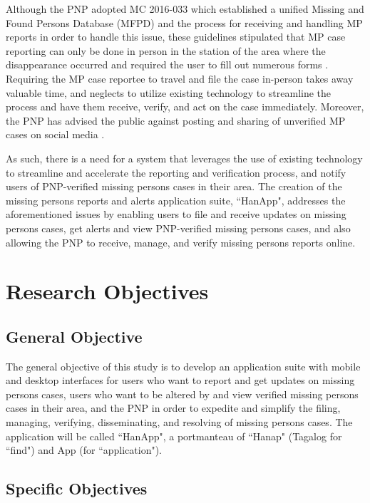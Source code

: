 Although the PNP adopted MC 2016-033 which established a unified Missing and Found Persons Database (MFPD) and the process for receiving and handling MP reports in order to handle this issue, these guidelines stipulated that MP case reporting can only be done in person in the station of the area where the disappearance occurred and required the user to fill out numerous forms \cite{NationalPoliceCommission}. Requiring the MP case reportee to travel and file the case in-person takes away valuable time, and neglects to utilize existing technology to streamline the process and have them receive, verify, and act on the case immediately. Moreover, the PNP has advised the public against posting and sharing of unverified MP cases on social media \cite{madarang_2022}.

As such, there is a need for a system that leverages the use of existing technology to streamline and accelerate the reporting and verification process, and notify users of PNP-verified missing persons cases in their area. The creation of the missing persons reports and alerts application suite, ``HanApp", addresses the aforementioned issues by enabling users to file and receive updates on missing persons cases, get alerts and view PNP-verified missing persons cases, and also allowing the PNP to receive, manage, and verify missing persons reports online.

\section{Research Objectives}
\label{sec:researchobjectives}

\subsection{General Objective}
\label{sec:generalobjective}

The general objective of this study is to develop an application suite with mobile and desktop interfaces for users who want to report and get updates on missing persons cases, users who want to be altered by and view verified missing persons cases in their area, and the PNP in order to expedite and simplify the filing, managing, verifying, disseminating, and resolving of missing persons cases. The application will be called ``HanApp", a portmanteau of ``Hanap" (Tagalog for ``find") and App (for ``application"). 

\newpage
\subsection{Specific Objectives}
\label{sec:specificobjectives}

